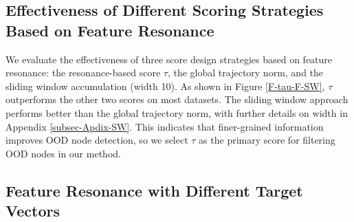 \subsection{Effectiveness of Different Scoring Strategies Based on Feature Resonance}
We evaluate the effectiveness of three score design strategies based on feature resonance: the resonance-based score $\tau$, the global trajectory norm, and the sliding window accumulation (width 10). As shown in Figure \ref{F-tau-F-SW}, $\tau$ outperforms the other two scores on most datasets. The sliding window approach performs better than the global trajectory norm, with further details on width in Appendix \ref{subsec-Apdix-SW}. This indicates that finer-grained information improves OOD node detection, so we select $\tau$ as the primary score for filtering OOD nodes in our method.


\subsection{Feature Resonance with Different Target Vectors} 

